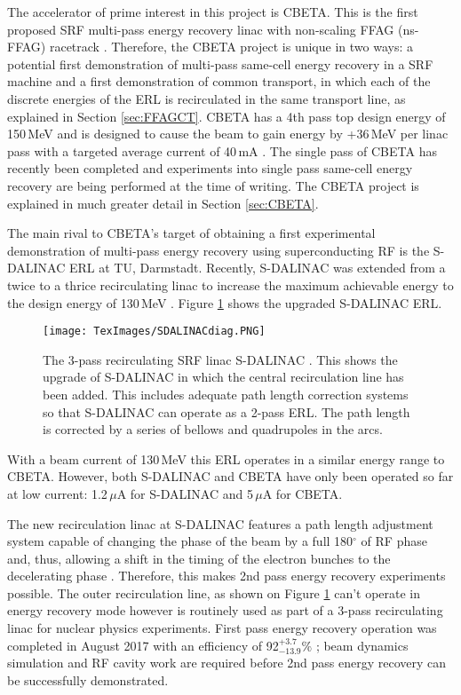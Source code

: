 \documentclass[11pt]{article}
\begin{document}
\vspace{5mm}

The accelerator of prime interest in this project is CBETA. This is the first proposed SRF multi-pass energy recovery linac with non-scaling FFAG (ns-FFAG) racetrack \cite{DejanIPAC2017}. Therefore, the CBETA project is unique in two ways: a potential first demonstration of multi-pass same-cell energy recovery in a SRF machine and a first demonstration of common transport, in which each of the discrete energies of the ERL is recirculated in the same transport line, as explained in Section \ref{sec:FFAGCT}. CBETA has a 4th pass top design energy of 150\,MeV and is designed to cause the beam to gain energy by +36\,MeV per linac pass with a targeted average current of 40\,mA \cite{IPAC2018CBETA}. The single pass of CBETA has recently been completed and experiments into single pass same-cell energy recovery are being performed at the time of writing. The CBETA project is explained in much greater detail in Section \ref{sec:CBETA}. 

\vspace{5mm}

The main rival to CBETA's target of obtaining a first experimental demonstration of multi-pass energy recovery using superconducting RF is the S-DALINAC ERL at TU, Darmstadt. Recently, S-DALINAC was extended from a twice to a thrice recirculating linac to increase the maximum achievable energy to the design energy of 130\,MeV \cite{SDALINAC2017IPAC}. Figure \ref{fig:SDALINAC3pass} shows the upgraded S-DALINAC ERL.

\begin{figure}[H]
\centering
\texttt{[image: TexImages/SDALINACdiag.PNG]}
\caption{\label{fig:SDALINAC3pass} The 3-pass recirculating SRF linac S-DALINAC \cite{SDALINAC2017IPAC}. This shows the upgrade of S-DALINAC in which the central recirculation line has been added. This includes adequate path length correction systems so that S-DALINAC can operate as a 2-pass ERL. The path length is corrected by a series of bellows and quadrupoles in the arcs.}
\end{figure}

With a beam current of 130\,MeV this ERL operates in a similar energy range to CBETA. However, both S-DALINAC and CBETA have only been operated so far at low current: 1.2\,$\mu$A for S-DALINAC \cite{SDALINAC2018IPAC} and 5\,$\mu$A for CBETA.

The new recirculation linac at S-DALINAC features a path length adjustment system capable of changing the phase of the beam by a full 180$^{\circ}$ of RF phase and, thus, allowing a shift in the timing of the electron bunches to the decelerating phase \cite{SDALINAC2017ERL}. Therefore, this makes 2nd pass energy recovery experiments possible. The outer recirculation line, as shown on Figure \ref{fig:SDALINAC3pass} can't operate in energy recovery mode however is routinely used as part of a 3-pass recirculating linac for nuclear physics experiments. First pass energy recovery operation was completed in August 2017 with an efficiency of 92$^{+3.7}_{-13.9}\%$ \cite{SDALINAC2018IPAC}; beam dynamics simulation and RF cavity work are required before 2nd pass energy recovery can be successfully demonstrated.
\end{document}
